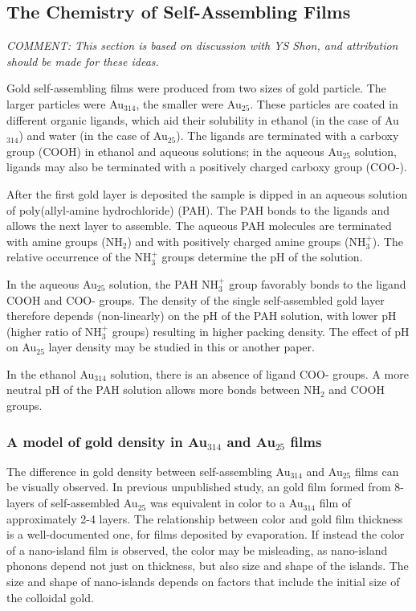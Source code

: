 \documentclass[12pt,oneside,english]{article}
\begin{document}
	\subsection{The Chemistry of Self-Assembling Films}
	
	\emph{COMMENT: This section is based on discussion with YS Shon, and attribution should be made for these ideas.}
	
	Gold self-assembling films were produced from two sizes of gold particle.  
	The larger particles were Au$_{314}$, the smaller were Au$_{25}$.  
	These particles are coated in different organic ligands, which aid their solubility in ethanol (in the case of Au$_{314}$) and water (in the case of Au$_{25}$).    
	The ligands are terminated with a carboxy group (COOH) in ethanol and aqueous solutions; in the aqueous Au$_{25}$ solution, ligands may also be terminated with a positively charged carboxy group (COO-). 
	
	After the first gold layer is deposited the sample is dipped in an aqueous solution of poly(allyl-amine hydrochloride) (PAH).  
	The PAH bonds to the ligands and allows the next layer to assemble.  	
	The aqueous PAH molecules are terminated with amine groups (NH$_2$) and with positively charged amine groups (NH$_3^+$).  
	The relative occurrence of the NH$_3^+$ groups determine the pH of the solution.
	
	In the aqueous Au$_{25}$ solution, the PAH NH$_3^+$ group favorably bonds to the ligand COOH and COO- groups.
	The density of the single self-assembled gold layer therefore depends (non-linearly) on the pH of the PAH solution, with lower pH (higher ratio of NH$_3^+$ groups) resulting in higher packing density.
	The effect of pH on Au$_{25}$ layer density may be studied in this or another paper.
	
	In the ethanol Au$_{314}$ solution, there is an absence of ligand COO- groups.
	A more neutral pH of the PAH solution allows more bonds between NH$_2$ and COOH groups.
	
	\subsubsection{A model of gold density in Au$_{314}$ and Au$_{25}$ films}
	The difference in gold density between self-assembling Au$_{314}$ and Au$_{25}$ films can be visually observed.
	In previous unpublished study, an gold film formed from 8-layers of self-assembled Au$_{25}$ was equivalent in color to a Au$_{314}$ film of approximately 2-4 layers.
	The relationship between color and gold film thickness is a well-documented one, for films deposited by evaporation.
	If instead the color of a nano-island film is observed, the color may be misleading, as nano-island phonons depend not just on thickness, but also size and shape of the islands.  
	The size and shape of nano-islands depends on factors that include the initial size of the colloidal gold.
	
\end{document}
